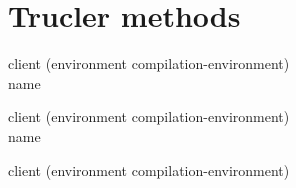 \chapter{Trucler methods}

 {client (environment
  compilation-environment) \\ name}

 {client (environment
  compilation-environment) \\ name}

 {client (environment
  compilation-environment)}
